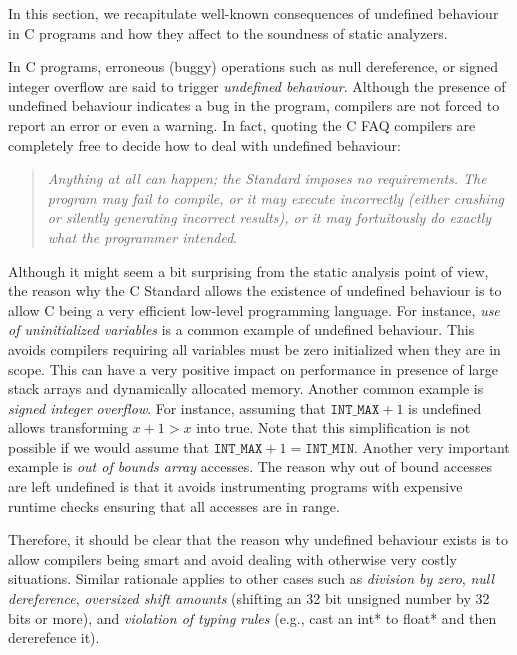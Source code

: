 \documentclass[a4]{article}
\begin{document}
In this section, we recapitulate well-known consequences of undefined
behaviour in C programs and how they affect to the soundness of static
analyzers. 

In C programs, erroneous (buggy) operations such as null dereference,
or signed integer overflow are said to trigger \emph{undefined
  behaviour}. Although the presence of undefined behaviour indicates a
bug in the program, compilers are not forced to report an error or
even a warning. In fact, quoting the C FAQ compilers are completely
free to decide how to deal with undefined behaviour:


\begin{quote} 
\emph{Anything at all can happen; the Standard imposes no
  requirements. The program may fail to compile, or it may execute
  incorrectly (either crashing or silently generating incorrect
  results), or it may fortuitously do exactly what the programmer
  intended}.
\end{quote}

Although it might seem a bit surprising from the static analysis point
of view, the reason why the C Standard allows the existence of
undefined behaviour is to allow C being a very efficient low-level
programming language. 
%
For instance, \emph{use of uninitialized variables} is a common
example of undefined behaviour. This avoids compilers requiring all
variables must be zero initialized when they are in scope. This can
have a very positive impact on performance in presence of large stack
arrays and dynamically allocated memory. Another common example is
\emph{signed integer overflow}.  For instance, assuming that $\mathtt{INT\_MAX}
+ 1$ is undefined allows transforming $x + 1 > x$ into true. Note that
this simplification is not possible if we would assume that $\mathtt{INT\_MAX}
+ 1 = \mathtt{INT\_MIN}$. Another very important example is \emph{out of bounds
  array} accesses. The reason why out of bound accesses are left
undefined is that it avoids instrumenting programs with expensive
runtime checks ensuring that all accesses are in range. 


Therefore, it should be clear that the reason why undefined behaviour
exists is to allow compilers being smart and avoid dealing with
otherwise very costly situations. Similar rationale applies to other
cases such as \emph{division by zero}, \emph{null dereference},
\emph{oversized shift amounts} (shifting an 32 bit unsigned number by
32 bits or more), and \emph{violation of typing rules} (e.g., cast an
int* to float* and then dererefence it).
\end{document}
